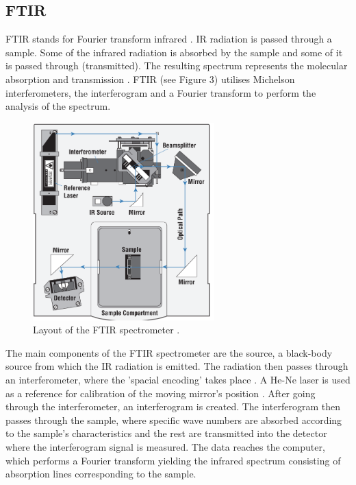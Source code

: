 \documentclass[reprint,amsmath,amssymb,aps, prl]{revtex4-2}
\begin{document}
\subsection{FTIR}
FTIR stands for Fourier transform infrared 
.
IR radiation is passed through a sample.
Some of the
infrared radiation is absorbed by the sample and some of it is
passed through (transmitted). The resulting spectrum represents the molecular
absorption and transmission \cite{FTIRmanual}. FTIR (see Figure 3) utilises Michelson interferometers, the interferogram and a Fourier transform to perform the analysis of the spectrum. 
\begin{figure}[h]
    \includegraphics[width=7cm]{Images/FTIR LAYOUT.png}
    \caption{Layout of the FTIR spectrometer \cite{FTIRmanual}.}
    \label{fig:FTIR}
    \centering
\end{figure}

The main components of the FTIR spectrometer are
the source, a black-body source from which the IR radiation is emitted. The radiation then passes through an interferometer, where the 'spacial encoding' takes place \cite{FTIRmanual}. A He-Ne laser is used as a reference for calibration of the moving mirror's position \cite{stuart}. After going through the interferometer, an interferogram is created. The interferogram then passes through the sample, where specific wave numbers are absorbed according to the sample's characteristics and the rest are transmitted into the detector where the interferogram signal is measured. The data reaches the computer, which performs a Fourier transform yielding the infrared spectrum consisting of absorption lines corresponding to the sample. 
\end{document}
